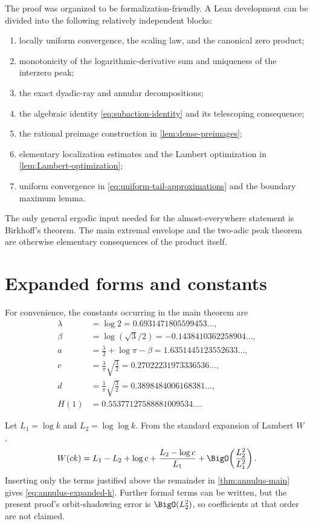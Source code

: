\documentclass[11pt,oneside]{article}
\theoremstyle{definition}
\theoremstyle{remark}
\begin{document}
The proof was organized to be formalization-friendly.  A Lean development can
be divided into the following relatively independent blocks:
\begin{enumerate}
 \item locally uniform convergence, the scaling law, and the canonical zero
 product;
 \item monotonicity of the logarithmic-derivative sum and uniqueness of the
 interzero peak;
 \item the exact dyadic-ray and annular decompositions;
 \item the algebraic identity \eqref{eq:subaction-identity} and its telescoping
 consequence;
 \item the rational preimage construction in \cref{lem:dense-preimages};
 \item elementary localization estimates and the Lambert optimization in
 \cref{lem:Lambert-optimization};
 \item uniform convergence in \eqref{eq:uniform-tail-approximations} and the
 boundary maximum lemma.
\end{enumerate}
The only general ergodic input needed for the almost-everywhere statement is
Birkhoff's theorem.  The main extremal envelope and the two-adic peak theorem
are otherwise elementary consequences of the product itself.

\appendix

\section{Expanded forms and constants}
\label{app:constants}

For convenience, the constants occurring in the main theorem are
\begin{align*}
 \lambda&=\log2=0.6931471805599453\ldots,\\
 \beta&=\log(\sqrt3/2)=-0.1438410362258904\ldots,\\
 a&=\frac\lambda2+\log\pi-\beta
   =1.6351445123552633\ldots,\\
 c&=\frac{\lambda}{\pi}\sqrt{\frac32}
   =0.27022231973336536\ldots,\\
 d&=\frac1\pi\sqrt{\frac32}
   =0.3898484006168381\ldots,\\
 H(1)&=0.55377127588881009534\ldots.
\end{align*}

Let \(L_1=\log k\) and \(L_2=\log\log k\).  From the standard expansion of
Lambert \(W\) \cite{corless1996},
\[
 W(ck)=L_1-L_2+\log c
 +\frac{L_2-\log c}{L_1}
 +\BigO\!\left(\frac{L_2^2}{L_1^2}\right).
\]
Inserting only the terms justified above the remainder in
\cref{thm:annulus-main} gives \eqref{eq:annulus-expanded-k}.  Further formal
terms can be written, but the present proof's orbit-shadowing error is
\(\BigO(L_2^2)\), so coefficients at that order are not claimed.
\end{document}
